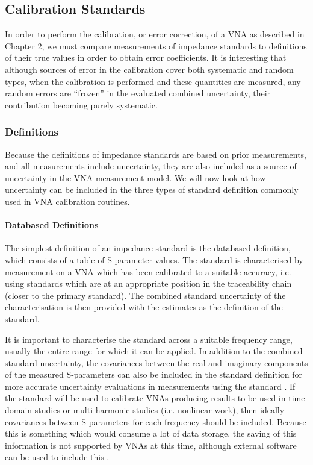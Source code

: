 \documentclass[../thesis/thesis.tex]{subfiles}
\begin{document}
\subsection{Calibration Standards}

In order to perform the calibration, or error correction, of a VNA as described in Chapter 2, we must compare measurements of impedance standards to definitions of their true values in order to obtain error coefficients. It is interesting that although sources of error in the calibration cover both systematic and random types, when the calibration is performed and these quantities are measured, any random errors are ``frozen'' in the evaluated combined uncertainty, their contribution becoming purely systematic.

\subsubsection{Definitions}

Because the definitions of impedance standards are based on prior measurements, and all measurements include uncertainty, they are also included as a source of uncertainty in the VNA measurement model. We will now look at how uncertainty can be included in the three types of standard definition commonly used in VNA calibration routines.

\paragraph{Databased Definitions}

The simplest definition of an impedance standard is the databased definition, which consists of a table of S-parameter values. The standard is characterised by measurement on a VNA which has been calibrated to a suitable accuracy, i.e. using standards which are at an appropriate position in the traceability chain (closer to the primary standard). The combined standard uncertainty of the characterisation is then provided with the estimates as the definition of the standard.

It is important to characterise the standard across a suitable frequency range, usually the entire range for which it can be applied. In addition to the combined standard uncertainty, the covariances between the real and imaginary components of the measured S-parameters can also be included in the standard definition for more accurate uncertainty evaluations in measurements using the standard \cite{Ridler_2002}. If the standard will be used to calibrate VNAs producing results to be used in time-domain studies or multi-harmonic studies (i.e. nonlinear work), then ideally covariances between S-parameters for each frequency should be included. Because this is something which would consume a lot of data storage, the saving of this information is not supported by VNAs at this time, although external software can be used to include this \cite{MUFWebsite}.
\end{document}
